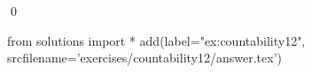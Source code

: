 
\begin{ex} 
  \label{ex:countability12}
  
  \qed
\end{ex} 
\begin{python0}
from solutions import *
add(label="ex:countability12",
    srcfilename='exercises/countability12/answer.tex') 
\end{python0}
